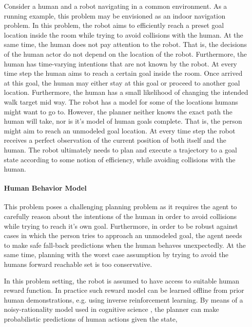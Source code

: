 Consider a human and a robot navigating in a common environment. As a running
example, this problem may be envisioned as an indoor navigation problem. In
this problem, the robot aims to efficiently reach a preset goal location
inside the room while trying to avoid collisions with the human. At the same
time, the human does not pay attention to the robot. That is, the decisions of
the human actor do not depend on the location of the robot. Furthermore, the
human has time-varying intentions that are not known by the robot. At every
time step the human aims to reach a certain goal inside the room. Once arrived
at this goal, the human may either stay at this goal or proceed to another goal
location. Furthermore, the human has a small likelihood of changing the
intended walk target mid way. The robot has a model for some of the locations
humans might want to go to. However, the planner neither knows the exact path
the human will take, nor is it's model of human goals complete. That is, the
person might aim to reach an unmodeled goal location. At every time step the
robot receives a perfect observation of the current position of both itself and
the human. The robot ultimately needs to plan and execute a trajectory to
a goal state according to some notion of efficiency, while avoiding collisions
with the human.

\paragraph{Human Behavior Model}

This problem poses a challenging planning problem as it requires the agent to
carefully reason about the intentions of the human in order to avoid collisions
while trying to reach it's own goal. Furthermore, in order to be robust against
cases in which the person tries to approach an unmodeled goal, the agent needs
to make safe fall-back predictions when the human behaves unexpectedly. At the
same time, planning with the worst case assumption by trying to avoid the
humans forward reachable set is too conservative.

In this problem setting, the robot is assumed to have access to suitable human
reward function. In practice such reward model can be learned offline from
prior human demonstrations, e.g. using inverse reinforcement
learning. By means of a noisy-rationality model used in cognitive
science \cite{baker2007goal}, the planner can make probabilistic predictions
of human actions given the state,

